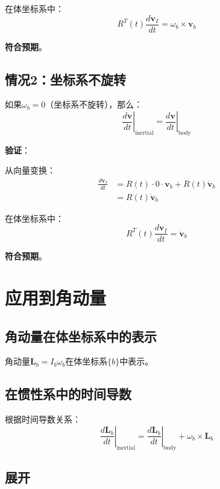 \documentclass[12pt,a4paper]{article}
\begin{document}
在体坐标系中：
\begin{equation}
R^T(t) \frac{d\bm{v}_I}{dt} = \omega_b \times \bm{v}_b
\end{equation}

\textbf{符合预期}。

\subsection{情况2：坐标系不旋转}

如果$\omega_b = 0$（坐标系不旋转），那么：
\begin{equation}
\left.\frac{d\bm{v}}{dt}\right|_{\text{inertial}} = \left.\frac{d\bm{v}}{dt}\right|_{\text{body}}
\end{equation}

\textbf{验证}：

从向量变换：
\begin{align}
\frac{d\bm{v}_I}{dt} &= R(t) \cdot 0 \cdot \bm{v}_b + R(t) \dot{\bm{v}}_b \\
&= R(t) \dot{\bm{v}}_b
\end{align}

在体坐标系中：
\begin{equation}
R^T(t) \frac{d\bm{v}_I}{dt} = \dot{\bm{v}}_b
\end{equation}

\textbf{符合预期}。

\section{应用到角动量}

\subsection{角动量在体坐标系中的表示}

角动量$\bm{L}_b = I_b \omega_b$在体坐标系$\{b\}$中表示。

\subsection{在惯性系中的时间导数}

根据时间导数关系：
\begin{equation}
\left.\frac{d\bm{L}_b}{dt}\right|_{\text{inertial}} = \left.\frac{d\bm{L}_b}{dt}\right|_{\text{body}} + \omega_b \times \bm{L}_b
\end{equation}

\subsection{展开}
\end{document}
